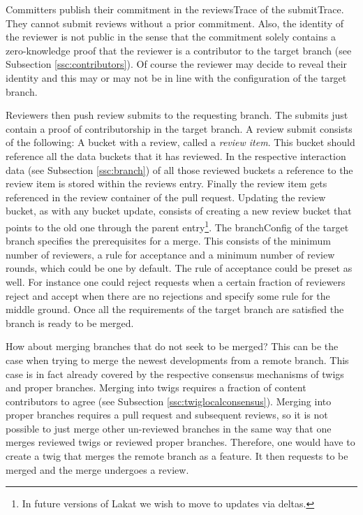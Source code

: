 Committers publish their commitment in the reviewsTrace of the submitTrace. They cannot submit reviews without a prior commitment. Also, the identity of the reviewer is not public in the sense that the commitment solely contains a zero-knowledge proof that the reviewer is a contributor to the target branch (see Subsection \ref{ssc:contributors}).
Of course the reviewer may decide to reveal their identity and this may or may not be in line with the configuration of the target branch.

Reviewers then push review submits to the requesting branch. The submits just contain a proof of contributorship in the target branch. A review submit consists of the following: A bucket with a review, called a \textit{review item}. This bucket should reference all the data buckets that it has reviewed. In the respective interaction data (see Subsection \ref{ssc:branch}) of all those reviewed buckets a reference to the review item is stored within the reviews entry. Finally the review item gets referenced in the review container of the pull request. Updating the review bucket, as with any bucket update, consists of creating a new review bucket that points to the old one through the parent entry\footnote{In future versions of Lakat we wish to move to updates via deltas.}. The branchConfig of the target branch specifies the prerequisites for a merge. This consists of the minimum number of reviewers, a rule for acceptance and a minimum number of review rounds, which could be one by default. The rule of acceptance could be preset as well. For instance one could reject requests when a certain fraction of reviewers reject and accept when there are no rejections and specify some rule for the middle ground. Once all the requirements of the target branch are satisfied the branch is ready to be merged. 

How about merging branches that do not seek to be merged? This can be the case when trying to merge the newest developments from a remote branch. This case is in fact already covered by the respective consensus mechanisms of twigs and proper branches. Merging into twigs requires a fraction of content contributors to agree (see Subsection \ref{ssc:twiglocalconsensus}). Merging into proper branches requires a pull request and subsequent reviews, so it is not possible to just merge other un-reviewed branches in the same way that one merges reviewed twigs or reviewed proper branches. Therefore, one would have to create a twig that merges the remote branch as a feature. It then requests to be merged and the merge undergoes a review.



